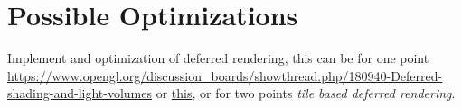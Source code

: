 \documentclass[12pt]{article}
\begin{document}
\section{Possible Optimizations}
Implement and optimization of deferred rendering, this can be for one point \href{deferred illumination}{https://www.opengl.org/discussion\_boards/showthread.php/180940-Deferred-shading-and-light-volumes}
or \href{http://ogldev.atspace.co.uk/www/tutorial37/tutorial37.html}{this}, or for two points \textit{tile based deferred rendering}.



\end{document}
